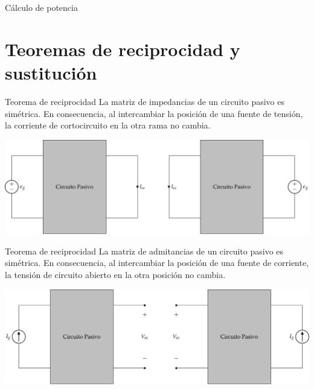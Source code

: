 \documentclass[aspectratio=169, usenames,svgnames,dvipsnames]{beamer}
\begin{document}
\begin{frame}[label={sec:orgbef27c7}]{Cálculo de potencia}
\end{frame}

\section{Teoremas de reciprocidad y sustitución}
\label{sec:orgd909c4d}

\begin{frame}[label={sec:org574e43f}]{Teorema de reciprocidad}
La matriz de impedancias de un circuito pasivo es simétrica. En
consecuencia, al intercambiar la posición de una fuente de tensión, la
corriente de cortocircuito en la otra rama no cambia.

\begin{center}
\includegraphics[width=.9\linewidth]{../figs/TeoremaReciprocidadTension.pdf}
\end{center}
\end{frame}

\begin{frame}[label={sec:orga562cdb}]{Teorema de reciprocidad}
La matriz de admitancias de un circuito pasivo es simétrica. En
consecuencia, al intercambiar la posición de una fuente de corriente, la
tensión de circuito abierto en la otra posición no cambia.

\begin{center}
\includegraphics[width=.9\linewidth]{../figs/TeoremaReciprocidadCorriente.pdf}
\end{center}
\end{frame}
\end{document}
